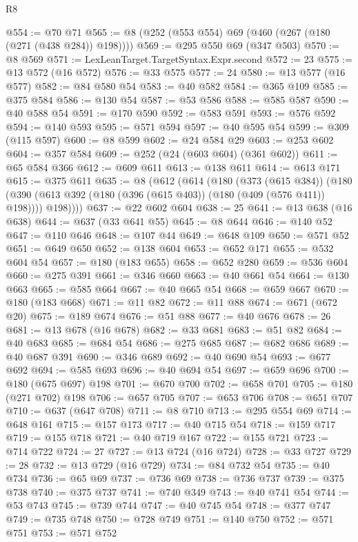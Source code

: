 \begin{lexlean}{R8}
\begin{coremodule}
@554 := @70 @71
@565 := @8 (@252 (@553 @554) @69 (@460 (@267 (@180 (@271 (@438 @284)) @198))))
@569 := @295 @550 @69 (@347 @503)
@570 := @8 @569
@571 := LexLeanTarget.TargetSyntax.Expr.second
@572 := 23
@575 := @13 @572 (@16 @572)
@576 := @33 @575
@577 := 24
@580 := @13 @577 (@16 @577)
@582 := @84 @580 @54
@583 := @40 @582
@584 := @365 @109
@585 := @375 @584
@586 := @130 @54
@587 := @53 @586
@588 := @585 @587
@590 := @40 @588 @54
@591 := @170 @590
@592 := @583 @591
@593 := @576 @592
@594 := @140 @593
@595 := @571 @594
@597 := @40 @595 @54
@599 := @309 (@115 @597)
@600 := @8 @599
@602 := @24 @584 @29
@603 := @253 @602
@604 := @357 @584
@609 := @252 (@24 (@603 @604) (@361 @602))
@611 := @65 @584 @366
@612 := @609 @611
@613 := @138 @611
@614 := @613 @171
@615 := @375 @611
@635 := @8
    (@612
      (@614
        (@180
          (@373 (@615 @384))
          (@180 (@390 (@613 @392 (@180 (@396 (@615 @403)) (@180 (@409 (@576 @411)) @198)))) @198))))
@637 := @22 @602 @604
@638 := 25
@641 := @13 @638 (@16 @638)
@644 := @637 (@33 @641 @55)
@645 := @8 @644
@646 := @140 @52
@647 := @110 @646
@648 := @107 @44
@649 := @648 @109
@650 := @571 @52
@651 := @649 @650
@652 := @138 @604
@653 := @652 @171
@655 := @532 @604 @54
@657 := @180 (@183 @655)
@658 := @652 @280
@659 := @536 @604
@660 := @275 @391
@661 := @346 @660
@663 := @40 @661 @54
@664 := @130 @663
@665 := @585 @664
@667 := @40 @665 @54
@668 := @659 @667
@670 := @180 (@183 @668)
@671 := @11 @82
@672 := @11 @88
@674 := @671 (@672 @20)
@675 := @189 @674
@676 := @51 @88
@677 := @40 @676
@678 := 26
@681 := @13 @678 (@16 @678)
@682 := @33 @681
@683 := @51 @82
@684 := @40 @683
@685 := @684 @54
@686 := @275 @685
@687 := @682 @686
@689 := @40 @687 @391
@690 := @346 @689
@692 := @40 @690 @54
@693 := @677 @692
@694 := @585 @693
@696 := @40 @694 @54
@697 := @659 @696
@700 := @180 (@675 @697) @198
@701 := @670 @700
@702 := @658 @701
@705 := @180 (@271 @702) @198
@706 := @657 @705
@707 := @653 @706
@708 := @651 @707
@710 := @637 (@647 @708)
@711 := @8 @710
@713 := @295 @554 @69
@714 := @648 @161
@715 := @157 @173
@717 := @40 @715 @54
@718 := @159 @717
@719 := @155 @718
@721 := @40 @719 @167
@722 := @155 @721
@723 := @714 @722
@724 := 27
@727 := @13 @724 (@16 @724)
@728 := @33 @727
@729 := 28
@732 := @13 @729 (@16 @729)
@734 := @84 @732 @54
@735 := @40 @734
@736 := @65 @69
@737 := @736 @69
@738 := @736 @737
@739 := @375 @738
@740 := @375 @737
@741 := @740 @349
@743 := @40 @741 @54
@744 := @53 @743
@745 := @739 @744
@747 := @40 @745 @54
@748 := @377 @747
@749 := @735 @748
@750 := @728 @749
@751 := @140 @750
@752 := @571 @751
@753 := @571 @752

\end{coremodule}
\end{lexlean}
